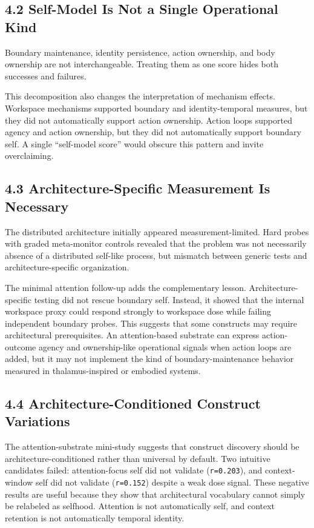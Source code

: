 \documentclass[
  11pt,
  letterpaper,
]{article}
\begin{document}
\subsection{4.2 Self-Model Is Not a Single Operational
Kind}\label{self-model-is-not-a-single-operational-kind}

Boundary maintenance, identity persistence, action ownership, and body
ownership are not interchangeable. Treating them as one score hides both
successes and failures.

This decomposition also changes the interpretation of mechanism effects.
Workspace mechanisms supported boundary and identity-temporal measures,
but they did not automatically support action ownership. Action loops
supported agency and action ownership, but they did not automatically
support boundary self. A single ``self-model score'' would obscure this
pattern and invite overclaiming.

\subsection{4.3 Architecture-Specific Measurement Is
Necessary}\label{architecture-specific-measurement-is-necessary}

The distributed architecture initially appeared measurement-limited.
Hard probes with graded meta-monitor controls revealed that the problem
was not necessarily absence of a distributed self-like process, but
mismatch between generic tests and architecture-specific organization.

The minimal attention follow-up adds the complementary lesson.
Architecture-specific testing did not rescue boundary self. Instead, it
showed that the internal workspace proxy could respond strongly to
workspace dose while failing independent boundary probes. This suggests
that some constructs may require architectural prerequisites. An
attention-based substrate can express action-outcome agency and
ownership-like operational signals when action loops are added, but it
may not implement the kind of boundary-maintenance behavior measured in
thalamus-inspired or embodied systems.

\subsection{4.4 Architecture-Conditioned Construct
Variations}\label{architecture-conditioned-construct-variations}

The attention-substrate mini-study suggests that construct discovery
should be architecture-conditioned rather than universal by default. Two
intuitive candidates failed: attention-focus self did not validate
(\texttt{r=0.203}), and context-window self did not validate
(\texttt{r=0.152}) despite a weak dose signal. These negative results
are useful because they show that architectural vocabulary cannot simply
be relabeled as selfhood. Attention is not automatically self, and
context retention is not automatically temporal identity.
\end{document}
